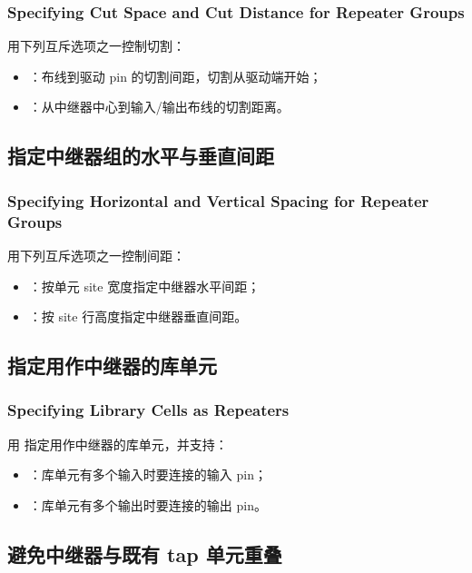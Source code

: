 \subsubsection*{Specifying Cut Space and Cut Distance for Repeater Groups}

用下列互斥选项之一控制切割：
\begin{itemize}
  \item {}：布线到驱动 pin 的切割间距，切割从驱动端开始；
  \item {}：从中继器中心到输入/输出布线的切割距离。
\end{itemize}

\subsection{指定中继器组的水平与垂直间距}
\subsubsection*{Specifying Horizontal and Vertical Spacing for Repeater Groups}

用下列互斥选项之一控制间距：
\begin{itemize}
  \item {}：按单元 site 宽度指定中继器水平间距；
  \item {}：按 site 行高度指定中继器垂直间距。
\end{itemize}

\subsection{指定用作中继器的库单元}
\subsubsection*{Specifying Library Cells as Repeaters}

用  指定用作中继器的库单元，并支持：
\begin{itemize}
  \item {}：库单元有多个输入时要连接的输入 pin；
  \item {}：库单元有多个输出时要连接的输出 pin。
\end{itemize}

\subsection{避免中继器与既有 tap 单元重叠}
